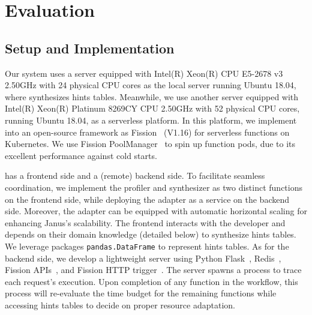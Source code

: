\section{Evaluation}
\label{sec:evaluation}

\subsection{Setup and Implementation}
\label{exp:setup}

Our system uses a server equipped with Intel(R) Xeon(R) CPU E5-2678 v3 2.50GHz with 24 physical CPU cores as the local server running Ubuntu 18.04, where \namex synthesizes hints tables.
Meanwhile, we use another server equipped with Intel(R) Xeon(R) Platinum 8269CY CPU 2.50GHz with 52 physical CPU cores, running Ubuntu 18.04, as a serverless platform.
In this platform, we implement \namex into an open-source framework as Fission~\cite{fission} (V1.16) for serverless functions on Kubernetes.
We use Fission PoolManager~\cite{fission-executor} to spin up function pods, due to its excellent performance against cold starts.

 \namex has a frontend side and a (remote) backend side.
To facilitate seamless coordination, we implement the profiler and synthesizer as two distinct functions on the frontend side, while deploying the adapter as a service on the backend side.
Moreover, the adapter can be equipped with automatic horizontal scaling for enhancing Janus's scalability.
The frontend interacts with the developer and depends on their domain knowledge (detailed below) to synthesize hints tables.
We leverage packages \texttt{pandas.DataFrame} to represent hints tables. 
As for the backend side, we develop a lightweight server using Python Flask~\cite{python-flask}, Redis~\cite{redis}, Fission APIs~\cite{fission-cli}, and Fission HTTP trigger~\cite{fission-http-trigger}. 
The server spawns a process to trace each request's execution.
Upon completion of any function in the workflow, this process will re-evaluate the time budget for the remaining functions while accessing hints tables to decide on proper resource adaptation.

